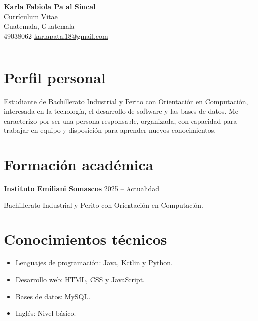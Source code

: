 \documentclass[11pt,a4paper]{article}
\begin{document}
\begin{center}
    {\Huge\bfseries\textcolor{rosaoscuro}{
    Karla Fabiola Patal Sincal}}\\[5pt]

    {\large\textcolor{rosa}{Currículum Vitae}}\\[8pt]

    \textcolor{rosaoscuro}{Guatemala, Guatemala}\\
    49038062 \quad
    \href{mailto:karlapatal18@gmail.com}
    {karlapatal18@gmail.com}
\end{center}

\vspace{3pt}
\hrule
\vspace{5pt}

\section*{Perfil personal}

Estudiante de Bachillerato Industrial y Perito con
Orientación en Computación, interesada en la tecnología,
el desarrollo de software y las bases de datos.
Me caracterizo por ser una persona responsable,
organizada, con capacidad para trabajar en equipo
y disposición para aprender nuevos conocimientos.

\section*{Formación académica}

\textbf{Instituto Emiliani Somascos}
\hfill \textcolor{rosaoscuro}{2025 -- Actualidad}

Bachillerato Industrial y Perito con Orientación
en Computación.

\section*{Conocimientos técnicos}

\begin{itemize}
    \item Lenguajes de programación: Java, Kotlin y Python.
    \item Desarrollo web: HTML, CSS y JavaScript.
    \item Bases de datos: MySQL.
    \item Inglés: Nivel básico.
\end{itemize}

\end{document}
